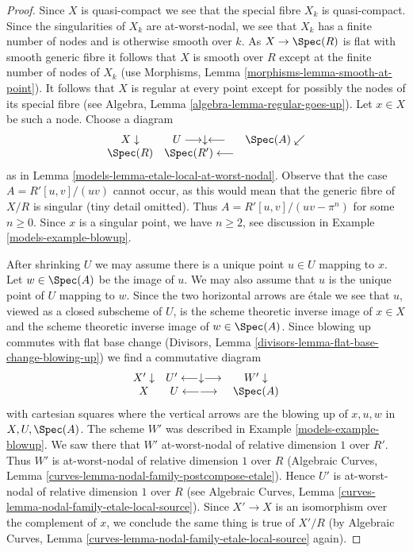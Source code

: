 \begin{proof}

Since $X$ is quasi-compact we see that the special fibre $X_k$ is quasi-compact.
Since the singularities of $X_k$ are at-worst-nodal, we see
that $X_k$ has a finite number of nodes and is otherwise
smooth over $k$. As $X \to \Spec(R)$ is flat with smooth generic
fibre it follows that $X$ is smooth over $R$ except at the
finite number of nodes of $X_k$
(use Morphisms, Lemma \ref{morphisms-lemma-smooth-at-point}).
It follows that $X$ is regular at every point except for possibly
the nodes of its special fibre
(see Algebra, Lemma \ref{algebra-lemma-regular-goes-up}).
Let $x \in X$ be such a node.
Choose a diagram
$$
\begin{array}{ccc}X \downarrow & U \longrightarrow\downarrow\longleftarrow & \Spec(A) \swarrow \\ \Spec(R) & \Spec(R') \longleftarrow & \end{array}
$$
as in Lemma \ref{models-lemma-etale-local-at-worst-nodal}.
Observe that the case $A = R'[u, v]/(uv)$ cannot
occur, as this would mean that the generic fibre of
$X/R$ is singular (tiny detail omitted). Thus $A = R'[u, v]/(uv - \pi^n)$
for some $n \geq 0$. Since $x$ is a singular point,
we have $n \geq 2$, see discussion in
Example \ref{models-example-blowup}.

\medskip\noindent
After shrinking $U$ we may assume there is
a unique point $u \in U$ mapping to $x$.
Let $w \in \Spec(A)$ be the image of $u$.
We may also assume that $u$ is the unique point of $U$
mapping to $w$.
Since the two horizontal arrows are \'etale
we see that $u$, viewed as a closed subscheme of $U$,
is the scheme theoretic inverse image of $x \in X$ and the
scheme theoretic inverse image of $w \in \Spec(A)$.
Since blowing up commutes with flat base change
(Divisors, Lemma \ref{divisors-lemma-flat-base-change-blowing-up})
we find a commutative diagram
$$
\begin{array}{ccc}X' \downarrow & U' \longleftarrow\downarrow\longrightarrow & W' \downarrow \\ X & U \longleftarrow\longrightarrow & \Spec(A)\end{array}
$$
with cartesian squares where the vertical arrows are the blowing
up of $x, u, w$ in $X, U, \Spec(A)$. The scheme $W'$ was described
in Example \ref{models-example-blowup}. We saw there that $W'$
at-worst-nodal of relative dimension $1$ over $R'$. Thus
$W'$ is at-worst-nodal of relative dimension $1$ over $R$
(Algebraic Curves, Lemma \ref{curves-lemma-nodal-family-postcompose-etale}).
Hence $U'$ is at-worst-nodal of relative dimension $1$ over $R$ (see
Algebraic Curves, Lemma \ref{curves-lemma-nodal-family-etale-local-source}).
Since $X' \to X$ is an isomorphism over the complement of $x$,
we conclude the same thing is true of $X'/R$ (by
Algebraic Curves, Lemma \ref{curves-lemma-nodal-family-etale-local-source}
again).


\end{proof}
